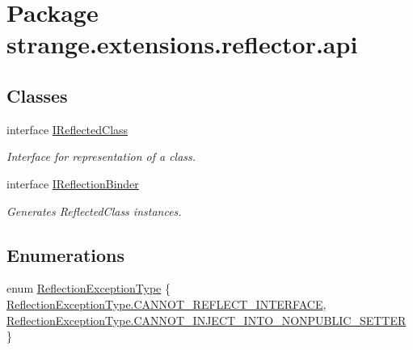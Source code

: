 \hypertarget{namespacestrange_1_1extensions_1_1reflector_1_1api}{\section{Package strange.\-extensions.\-reflector.\-api}
\label{namespacestrange_1_1extensions_1_1reflector_1_1api}
}
\subsection*{Classes}
\begin{DoxyCompactItemize}
\item 
interface \hyperlink{interfacestrange_1_1extensions_1_1reflector_1_1api_1_1_i_reflected_class}{I\-Reflected\-Class}
\begin{DoxyCompactList}\small\item\em Interface for representation of a class. \end{DoxyCompactList}\item 
interface \hyperlink{interfacestrange_1_1extensions_1_1reflector_1_1api_1_1_i_reflection_binder}{I\-Reflection\-Binder}
\begin{DoxyCompactList}\small\item\em Generates {\ttfamily Reflected\-Class} instances. \end{DoxyCompactList}\end{DoxyCompactItemize}
\subsection*{Enumerations}
\begin{DoxyCompactItemize}
\item 
enum \hyperlink{namespacestrange_1_1extensions_1_1reflector_1_1api_a4470d7d3edf61dfa229aec6e9a914159}{Reflection\-Exception\-Type} \{ \hyperlink{namespacestrange_1_1extensions_1_1reflector_1_1api_a4470d7d3edf61dfa229aec6e9a914159af31a2902a8b90d6040a9f5ac471ddc04}{Reflection\-Exception\-Type.\-C\-A\-N\-N\-O\-T\-\_\-\-R\-E\-F\-L\-E\-C\-T\-\_\-\-I\-N\-T\-E\-R\-F\-A\-C\-E}, 
\hyperlink{namespacestrange_1_1extensions_1_1reflector_1_1api_a4470d7d3edf61dfa229aec6e9a914159a4ecaa749a0f4a0dc3d59c330f3a8295c}{Reflection\-Exception\-Type.\-C\-A\-N\-N\-O\-T\-\_\-\-I\-N\-J\-E\-C\-T\-\_\-\-I\-N\-T\-O\-\_\-\-N\-O\-N\-P\-U\-B\-L\-I\-C\-\_\-\-S\-E\-T\-T\-E\-R}
 \}
\end{DoxyCompactItemize}


